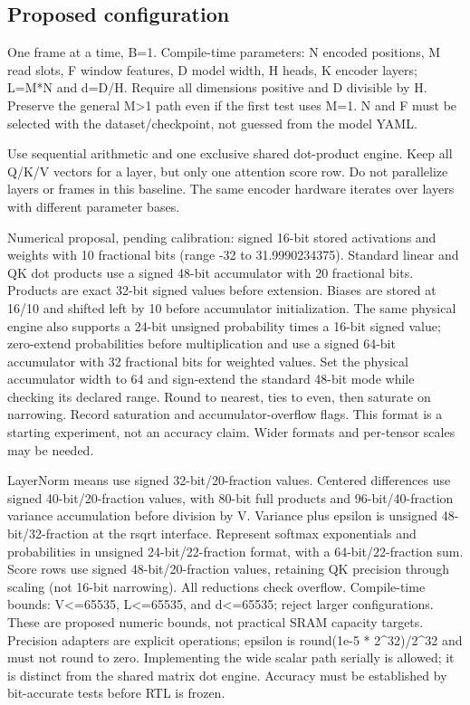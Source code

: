 \documentclass[11pt,a4paper]{article}
\begin{document}
\subsection{Proposed configuration}

One frame at a time, B=1. Compile-time parameters: N encoded positions, M read slots, F window features, D model width, H heads, K encoder layers; L=M*N and d=D/H. Require all dimensions positive and D divisible by H. Preserve the general M>1 path even if the first test uses M=1. N and F must be selected with the dataset/checkpoint, not guessed from the model YAML.

Use sequential arithmetic and one exclusive shared dot-product engine. Keep all Q/K/V vectors for a layer, but only one attention score row. Do not parallelize layers or frames in this baseline. The same encoder hardware iterates over layers with different parameter bases.

Numerical proposal, pending calibration: signed 16-bit stored activations and weights with 10 fractional bits (range -32 to 31.9990234375). Standard linear and QK dot products use a signed 48-bit accumulator with 20 fractional bits. Products are exact 32-bit signed values before extension. Biases are stored at 16/10 and shifted left by 10 before accumulator initialization. The same physical engine also supports a 24-bit unsigned probability times a 16-bit signed value; zero-extend probabilities before multiplication and use a signed 64-bit accumulator with 32 fractional bits for weighted values. Set the physical accumulator width to 64 and sign-extend the standard 48-bit mode while checking its declared range. Round to nearest, ties to even, then saturate on narrowing. Record saturation and accumulator-overflow flags. This format is a starting experiment, not an accuracy claim. Wider formats and per-tensor scales may be needed.

LayerNorm means use signed 32-bit/20-fraction values. Centered differences use signed 40-bit/20-fraction values, with 80-bit full products and 96-bit/40-fraction variance accumulation before division by V. Variance plus epsilon is unsigned 48-bit/32-fraction at the rsqrt interface. Represent softmax exponentials and probabilities in unsigned 24-bit/22-fraction format, with a 64-bit/22-fraction sum. Score rows use signed 48-bit/20-fraction values, retaining QK precision through scaling (not 16-bit narrowing). All reductions check overflow. Compile-time bounds: V<=65535, L<=65535, and d<=65535; reject larger configurations. These are proposed numeric bounds, not practical SRAM capacity targets. Precision adapters are explicit operations; epsilon is round(1e-5 * 2\textasciicircum{}32)/2\textasciicircum{}32 and must not round to zero. Implementing the wide scalar path serially is allowed; it is distinct from the shared matrix dot engine. Accuracy must be established by bit-accurate tests before RTL is frozen.
\end{document}
